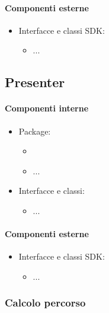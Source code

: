 \documentclass[../Funzionalita.tex]{subfiles}
\begin{document}
			
			\paragraph*{Componenti esterne}
			
			\begin{itemize}
				\item Interfacce e classi SDK:
				\begin{itemize}
					\item[] ...
				\end{itemize}
			\end{itemize}
		
		\subsection{Presenter}
		
			\paragraph*{Componenti interne}
			\begin{itemize}
			
				\item Package:
				\begin{itemize}
					\item[]
					\item[] ...
				\end{itemize}
				
				\item Interfacce e classi:
				\begin{itemize}
					\item[] ...
				\end{itemize}
				
			\end{itemize}
			
			
			\paragraph*{Componenti esterne}
			
			\begin{itemize}
				\item Interfacce e classi SDK:
				\begin{itemize}
					\item[] ...
				\end{itemize}
			\end{itemize}
					
		
		\subsubsection{Calcolo percorso}
		
\end{document}
